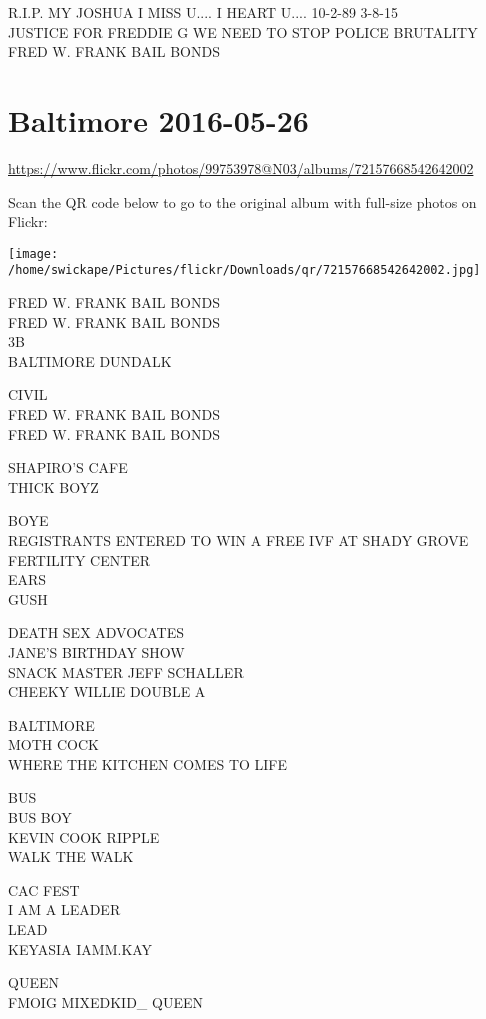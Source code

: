 \documentclass[10pt,letterpaper]{article}
\begin{document}
R.I.P. MY JOSHUA I MISS U.... I HEART U.... 10{-}2{-}89 3{-}8{-}15\\
JUSTICE FOR FREDDIE G WE NEED TO STOP POLICE BRUTALITY\\
FRED W. FRANK BAIL BONDS
\pagebreak

\section*{Baltimore 2016-05-26}

\url{https://www.flickr.com/photos/99753978@N03/albums/72157668542642002}

Scan the QR code below to go to the original album with full-size photos on Flickr:

\texttt{[image: /home/swickape/Pictures/flickr/Downloads/qr/72157668542642002.jpg]}
\pagebreak

FRED W. FRANK BAIL BONDS\\
FRED W. FRANK BAIL BONDS\\
3B\\
BALTIMORE DUNDALK

CIVIL\\
FRED W. FRANK BAIL BONDS\\
FRED W. FRANK BAIL BONDS

SHAPIRO'S CAFE\\
THICK BOYZ

BOYE\\
REGISTRANTS ENTERED TO WIN A FREE IVF AT SHADY GROVE FERTILITY CENTER\\
EARS\\
GUSH

DEATH SEX ADVOCATES\\
JANE'S BIRTHDAY SHOW\\
SNACK MASTER JEFF SCHALLER\\
CHEEKY WILLIE DOUBLE A

BALTIMORE\\
MOTH COCK\\
WHERE THE KITCHEN COMES TO LIFE

BUS\\
BUS BOY\\
KEVIN COOK RIPPLE\\
WALK THE WALK

CAC FEST\\
I AM A LEADER\\
LEAD\\
KEYASIA IAMM.KAY

QUEEN\\
FMOIG MIXEDKID\_ QUEEN
\end{document}
